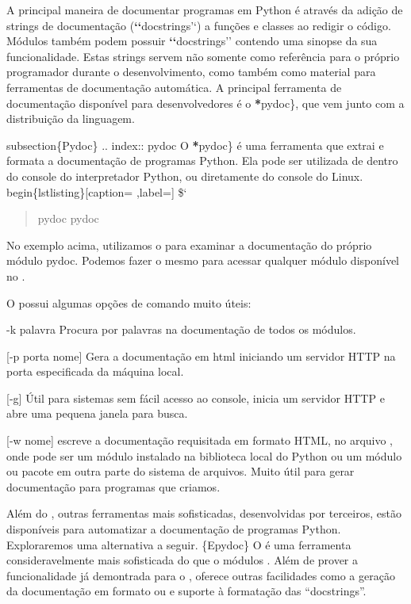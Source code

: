 \documentclass[a4paper,10pt,brazil]{sphinxmanual}
\begin{document}
A principal maneira de documentar programas em Python é através da adição de strings de documentação ({\color{red}\bfseries{}{}`{}`}docstrings'`) a funções e classes ao redigir o código. Módulos também podem possuir {\color{red}\bfseries{}{}`{}`}docstrings'' contendo uma sinopse da sua funcionalidade. Estas strings servem não somente como referência para o próprio programador durante o desenvolvimento, como também como material para ferramentas de documentação automática. A principal ferramenta de documentação disponível para desenvolvedores é o {\color{red}\bfseries{}*}pydoc\}, que vem junto com a distribuição  da linguagem.

subsection\{Pydoc\}
.. index:: pydoc
O {\color{red}\bfseries{}*}pydoc\} é uma ferramenta que extrai e formata a documentação de programas Python. Ela pode ser utilizada de dentro do console do interpretador Python, ou diretamente do console do Linux.
begin\{lstlisting\}{[}caption= ,label={]}
\${}`
\begin{quote}

pydoc pydoc
\end{quote}

No exemplo acima, utilizamos o  para examinar a
documentação do próprio módulo pydoc. Podemos fazer o mesmo para
acessar qualquer módulo disponível no .

O  possui algumas opções de comando muito úteis:
\begin{optionlist}{3cm}
\item [-k palavra]  
Procura por palavras na documentação de todos os módulos.

{[}-p porta nome{]} Gera a documentação em html iniciando um servidor
HTTP na porta especificada da máquina local.

{[}-g{]} Útil para sistemas sem fácil acesso ao console, inicia um
servidor HTTP e abre uma pequena janela para busca.

{[}-w nome{]} escreve a documentação requisitada em formato HTML, no
arquivo , onde  pode ser um módulo
instalado na biblioteca local do Python ou um módulo ou pacote em
outra parte do sistema de arquivos. Muito útil para gerar
documentação para programas que criamos.
\end{optionlist}

Além do , outras ferramentas mais sofisticadas,
desenvolvidas por terceiros, estão disponíveis para automatizar a
documentação de programas Python. Exploraremos uma alternativa a
seguir. \{Epydoc\} O  é uma ferramenta consideravelmente
mais sofisticada do que o módulos . Além de prover a
funcionalidade já demontrada para o , oferece outras
facilidades como a geração da documentação em formato  ou
 e suporte à formatação das ``docstrings''.
\end{document}
